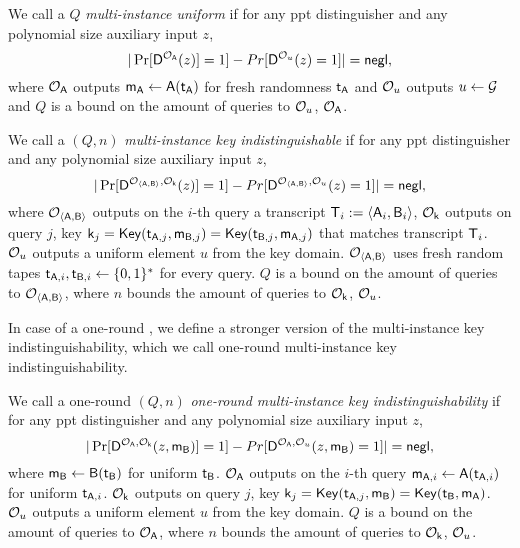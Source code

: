 \begin{definition}
We call a \UKA $Q$ \emph{multi-instance uniform} if for any ppt distinguisher \D and any polynomial size auxiliary input $z$,
$$
|\Pr[\mathsf D^{\mathcal{O}_{\mathsf{A}}}(z)]=1]-Pr[\mathsf D^{\mathcal{O}_{u}}(z)=1]|=\mathsf{negl},
$$
where $\mathcal{O}_{\mathsf{A}}$ outputs $\mathsf{m}_\mathsf{A}\leftarrow\mathsf{A}(\mathsf{t}_\mathsf{A})$ for fresh randomness $\mathsf{t}_\mathsf{A}$ and $\mathcal{O}_u$ outputs $u\leftarrow\mathcal{G}$ and $Q$ is a bound on the amount of queries to $\mathcal{O}_{u}$, $\mathcal{O}_{\mathsf{A}}$.
\end{definition}



\begin{definition}
We call a \UKA $(Q,n)$ \emph{multi-instance key indistinguishable} if for any ppt distinguisher \D and any polynomial size auxiliary input $z$,
$$
|\Pr[\mathsf D^{\mathcal{O}_{\langle \mathsf{A},\mathsf{B}\rangle}, \mathcal{O}_{\mathsf{k}}}(z)]=1]-Pr[\mathsf D^{\mathcal{O}_{\langle \mathsf{A},\mathsf{B}\rangle},\mathcal{O}_{u}}(z)=1]|=\mathsf{negl},
$$
where $\mathcal{O}_{\langle \mathsf{A},\mathsf{B}\rangle}$ outputs on the $i$-th query a transcript $\mathsf{T}_i:=\langle \mathsf{A}_i,\mathsf{B}_i\rangle$, $\mathcal{O}_{\mathsf{k}}$ outputs on query $j$, key $\mathsf{k}_j=\mathsf{Key}(\mathsf{t}_{\mathsf{A},j},\mathsf{m}_{\mathsf{B},j})=\mathsf{Key}(\mathsf{t}_{\mathsf{B},j},\mathsf{m}_{\mathsf{A},j})$ that matches transcript $\mathsf{T}_i$. $\mathcal{O}_u$ outputs a uniform element $u$ from the key domain. $\mathcal{O}_{\langle \mathsf{A},\mathsf{B}\rangle}$ uses fresh random tapes $\mathsf{t}_{\mathsf{A},i},\mathsf{t}_{\mathsf{B},i}\leftarrow\{0,1\}^*$ for every query. $Q$ is a bound on the amount of queries to $\mathcal{O}_{\langle \mathsf{A},\mathsf{B}\rangle}$, where $n$ bounds the amount of queries to $\mathcal{O}_{\mathsf{k}}$, $\mathcal{O}_{u}$. 
\end{definition}

In case of a one-round \UKA, we define a stronger version of the multi-instance key indistinguishability, which we call one-round multi-instance key indistinguishability.

\begin{definition}
We call a one-round \UKA $(Q,n)$ \emph{one-round multi-instance key indistinguishability} if for any ppt distinguisher \D and any polynomial size auxiliary input $z$,
$$
|\Pr[\mathsf D^{\mathcal{O}_{\mathsf{A}}, \mathcal{O}_{\mathsf{k}}}(z,\mathsf{m}_\mathsf{B})]=1]-Pr[\mathsf D^{\mathcal{O}_{\mathsf{A}},\mathcal{O}_{u}}(z,\mathsf{m}_\mathsf{B})=1]|=\mathsf{negl},
$$
where $\mathsf{m}_{\mathsf{B}}\leftarrow\mathsf{B}(\mathsf{t}_{\mathsf{B}})$ for uniform $\mathsf{t}_{\mathsf{B}}$. $\mathcal{O}_{\mathsf{A}}$ outputs on the $i$-th query $\mathsf{m}_{\mathsf{A},i}\leftarrow \mathsf{A}(\mathsf{t}_{\mathsf{A},i})$ for uniform $\mathsf{t}_{\mathsf{A},i}$. $\mathcal{O}_{\mathsf{k}}$ outputs on query $j$, key $\mathsf{k}_j=\mathsf{Key}(\mathsf{t}_{\mathsf{A},j},\mathsf{m}_{\mathsf{B}})=\mathsf{Key}(\mathsf{t}_{\mathsf{B}},\mathsf{m}_{\mathsf{A}})$. $\mathcal{O}_u$ outputs a uniform element $u$ from the key domain. $Q$ is a bound on the amount of queries to $\mathcal{O}_{\mathsf{A}}$, where $n$ bounds the amount of queries to $\mathcal{O}_{\mathsf{k}}$, $\mathcal{O}_{u}$. 
\end{definition}

